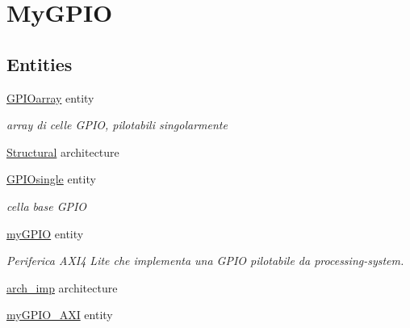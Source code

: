 \hypertarget{group__my_g_p_i_o}{\section{My\+G\+P\+I\+O}
\label{group__my_g_p_i_o}
}
\subsection*{Entities}
\begin{DoxyCompactItemize}
\item 
\hyperlink{class_g_p_i_oarray}{G\+P\+I\+Oarray} entity
\begin{DoxyCompactList}\small\item\em array di celle G\+P\+I\+O, pilotabili singolarmente \end{DoxyCompactList}\item 
\hyperlink{class_g_p_i_oarray_1_1_structural}{Structural} architecture
\item 
\hyperlink{class_g_p_i_osingle}{G\+P\+I\+Osingle} entity
\begin{DoxyCompactList}\small\item\em cella base G\+P\+I\+O \end{DoxyCompactList}\item 
\hyperlink{classmy_g_p_i_o}{my\+G\+P\+I\+O} entity
\begin{DoxyCompactList}\small\item\em Periferica A\+X\+I4 Lite che implementa una G\+P\+I\+O pilotabile da processing-\/system. \end{DoxyCompactList}\item 
\hyperlink{classmy_g_p_i_o_1_1arch__imp}{arch\+\_\+imp} architecture
\item 
\hyperlink{classmy_g_p_i_o___a_x_i}{my\+G\+P\+I\+O\+\_\+\+A\+X\+I} entity
\end{DoxyCompactItemize}
